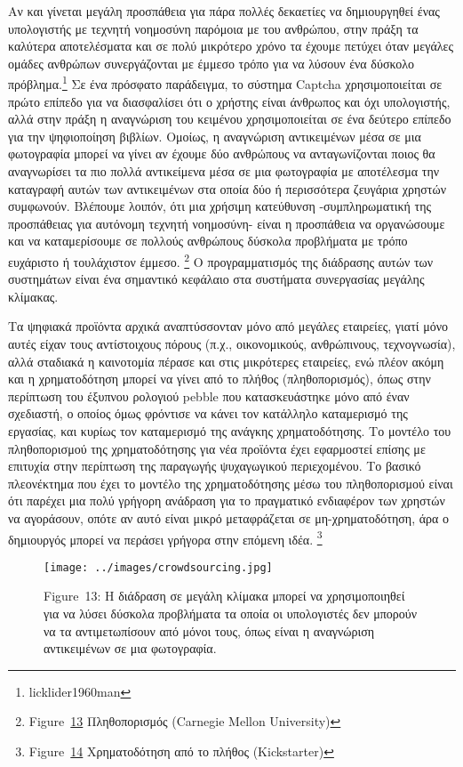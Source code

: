\documentclass[
]{article}
\begin{document}
Αν και γίνεται μεγάλη προσπάθεια για πάρα πολλές δεκαετίες να
δημιουργηθεί ένας υπολογιστής με τεχνητή νοημοσύνη παρόμοια με του
ανθρώπου, στην πράξη τα καλύτερα αποτελέσματα και σε πολύ μικρότερο
χρόνο τα έχουμε πετύχει όταν μεγάλες ομάδες ανθρώπων συνεργάζονται με
έμμεσο τρόπο για να λύσουν ένα δύσκολο πρόβλημα.\footnote{licklider1960man}
Σε ένα πρόσφατο παράδειγμα, το σύστημα Captcha χρησιμοποιείται σε πρώτο
επίπεδο για να διασφαλίσει ότι ο χρήστης είναι άνθρωπος και όχι
υπολογιστής, αλλά στην πράξη η αναγνώριση του κειμένου χρησιμοποιείται
σε ένα δεύτερο επίπεδο για την ψηφιοποίηση βιβλίων. Ομοίως, η αναγνώριση
αντικειμένων μέσα σε μια φωτογραφία μπορεί να γίνει αν έχουμε δύο
ανθρώπους να ανταγωνίζονται ποιος θα αναγνωρίσει τα πιο πολλά
αντικείμενα μέσα σε μια φωτογραφία με αποτέλεσμα την καταγραφή αυτών των
αντικειμένων στα οποία δύο ή περισσότερα ζευγάρια χρηστών συμφωνούν.
Βλέπουμε λοιπόν, ότι μια χρήσιμη κατεύθυνση -συμπληρωματική της
προσπάθειας για αυτόνομη τεχνητή νοημοσύνη- είναι η προσπάθεια να
οργανώσουμε και να καταμερίσουμε σε πολλούς ανθρώπους δύσκολα προβλήματα
με τρόπο ευχάριστο ή τουλάχιστον έμμεσο. \footnote{Figure~\protect\hyperlink{fig:crowdsourcing}{13}
  Πληθοπορισμός (Carnegie Mellon University)} Ο προγραμματισμός της
διάδρασης αυτών των συστημάτων είναι ένα σημαντικό κεφάλαιο στα
συστήματα συνεργασίας μεγάλης κλίμακας.

Τα ψηφιακά προϊόντα αρχικά αναπτύσσονταν μόνο από μεγάλες εταιρείες,
γιατί μόνο αυτές είχαν τους αντίστοιχους πόρους (π.χ., οικονομικούς,
ανθρώπινους, τεχνογνωσία), αλλά σταδιακά η καινοτομία πέρασε και στις
μικρότερες εταιρείες, ενώ πλέον ακόμη και η χρηματοδότηση μπορεί να
γίνει από το πλήθος (πληθοπορισμός), όπως στην περίπτωση του έξυπνου
ρολογιού pebble που κατασκευάστηκε μόνο από έναν σχεδιαστή, ο οποίος
όμως φρόντισε να κάνει τον κατάλληλο καταμερισμό της εργασίας, και
κυρίως τον καταμερισμό της ανάγκης χρηματοδότησης. Το μοντέλο του
πληθοπορισμού της χρηματοδότησης για νέα προϊόντα έχει εφαρμοστεί επίσης
με επιτυχία στην περίπτωση της παραγωγής ψυχαγωγικού περιεχομένου. Το
βασικό πλεονέκτημα που έχει το μοντέλο της χρηματοδότησης μέσω του
πληθοπορισμού είναι ότι παρέχει μια πολύ γρήγορη ανάδραση για το
πραγματικό ενδιαφέρον των χρηστών να αγοράσουν, οπότε αν αυτό είναι
μικρό μεταφράζεται σε μη-χρηματοδότηση, άρα ο δημιουργός μπορεί να
περάσει γρήγορα στην επόμενη ιδέα. \footnote{Figure~\protect\hyperlink{fig:kickstarter-pebble}{14}
  Χρηματοδότηση από το πλήθος (Kickstarter)}

\leavevmode{}%
\begin{figure}
\hypertarget{fig:crowdsourcing}{%
\centering
\texttt{[image: ../images/crowdsourcing.jpg]}
\caption{Figure~13: Η διάδραση σε μεγάλη κλίμακα μπορεί να
χρησιμοποιηθεί για να λύσει δύσκολα προβλήματα τα οποία οι υπολογιστές
δεν μπορούν να τα αντιμετωπίσουν από μόνοι τους, όπως είναι η αναγνώριση
αντικειμένων σε μια φωτογραφία.}\label{fig:crowdsourcing}
}
\end{figure}
\end{document}
